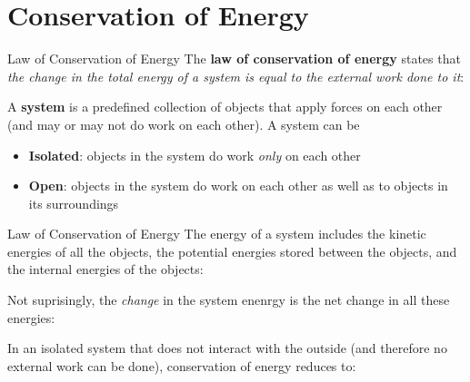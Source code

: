 \documentclass[12pt,compress,aspectratio=169]{beamer}
\begin{document}
\section{Conservation of Energy}

\begin{frame}{Law of Conservation of Energy}
  The \textbf{law of conservation of energy} states that \emph{the change in
  the total energy of a system is equal to the external work done to it}:


  A \textbf{system} is a predefined collection of objects that apply forces
  on each other (and may or may not do work on each other). A system can be
  \begin{itemize}
  \item\textbf{Isolated}: objects in the system do work \emph{only} on
    each other
  \item\textbf{Open}: objects in the system do work on each other as
    well as to objects in its surroundings
  \end{itemize}
\end{frame}



\begin{frame}{Law of Conservation of Energy}
  The energy of a system includes the kinetic energies of all the objects, the
  potential energies stored between the objects, and the internal energies of
  the objects:

  
  Not suprisingly, the \emph{change} in the system enenrgy is the net change
  in all these energies:
  

  \vspace{-.1in}In an isolated system that does not interact with the outside
  (and therefore no external work can be done), conservation of energy reduces
  to:

\end{frame}
\end{document}
